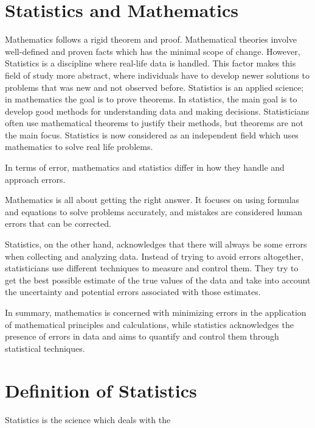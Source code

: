\documentclass[
]{book}
\begin{document}
\hypertarget{statistics-and-mathematics}{%
\section{Statistics and Mathematics}\label{statistics-and-mathematics}}

Mathematics follows a rigid theorem and proof. Mathematical theories
involve well-defined and proven facts which has the minimal scope of
change. However, Statistics is a discipline where real-life data is
handled. This factor makes this field of study more abstract, where
individuals have to develop newer solutions to problems that was new and
not observed before. Statistics is an applied science; in mathematics
the goal is to prove theorems. In statistics, the main goal is to
develop good methods for understanding data and making decisions.
Statisticians often use mathematical theorems to justify their methods,
but theorems are not the main focus. Statistics is now considered as an
independent field which uses mathematics to solve real life problems.

In terms of error, mathematics and statistics differ in how they handle and approach errors.

Mathematics is all about getting the right answer. It focuses on using formulas and equations to solve problems accurately, and mistakes are considered human errors that can be corrected.

Statistics, on the other hand, acknowledges that there will always be some errors when collecting and analyzing data. Instead of trying to avoid errors altogether, statisticians use different techniques to measure and control them. They try to get the best possible estimate of the true values of the data and take into account the uncertainty and potential errors associated with those estimates.

In summary, mathematics is concerned with minimizing errors in the application of mathematical principles and calculations, while statistics acknowledges the presence of errors in data and aims to quantify and control them through statistical techniques.

\hypertarget{definition-of-statistics}{%
\section{Definition of Statistics}\label{definition-of-statistics}}

Statistics is the science which deals with the
\end{document}
